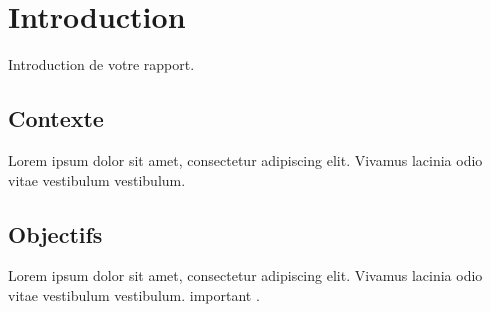 \section{Introduction}
Introduction de votre rapport.

\subsection{Contexte}
Lorem ipsum dolor sit amet, consectetur adipiscing elit. Vivamus lacinia odio vitae vestibulum vestibulum.


\subsection{Objectifs}
Lorem ipsum dolor sit amet, consectetur adipiscing elit. Vivamus lacinia odio vitae vestibulum vestibulum.
important \cite{ref1}. 